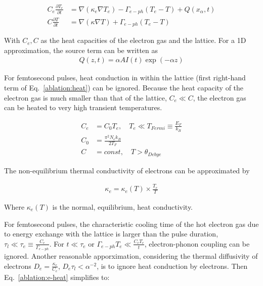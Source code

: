         \begin{align}
            C_e \frac{\partial T_e}{\partial t} &= \nabla (\kappa_e \nabla T_e) - \Gamma_{e-ph}(T_e - T) + Q(x_\alpha, t) \label{ablation:e-heat} \\
            C \frac{\partial T}{\partial t} &= \nabla (\kappa \nabla T) + \Gamma_{e-ph}(T_e - T) \label{ablation:heat}
        \end{align}

        With $C_e, C$ as the heat capacities of the electron gas and the lattice. For a 1D approximation, the source term can
        be written as
        \begin{align}
            Q(z,t) = \alpha A I(t) \exp(-\alpha z)
        \end{align}

        For femtosecond pulses, heat conduction in within the lattice (first right-hand term of Eq.~\ref{ablation:heat}) can be ignored.
        Because the heat capacity of the electron gas is much smaller than that of the lattice, $C_e \ll C$,  the electron gas can
        be heated to very high transient temperatures.

        \begin{align}
            C_e &= C_0 T_e, \quad T_e \ll T_{Fermi} \equiv \frac{E_F}{k_B} \\
            C_0 &= \frac{\pi^2 N_e k_B}{2T_F} \\
            C &= const, \quad T > \theta_{Debye}
        \end{align}

        The non-equilibrium thermal conductivity of electrons can be approximated by

        \begin{align}
            \kappa_e = \kappa_e(T) \times \frac{T_e}{T}
        \end{align}

        Where $\kappa_e(T)$ is the normal, equilibrium, heat conductivity.

            For femtosecond pulses, the characteristic cooling time of the hot electron gas due to energy exchange with the lattice
        is larger than the pulse duration, $\tau_l \ll \tau_e \equiv \frac{C_e}{\Gamma_{e-ph}}$. For
        $t \ll \tau_e$ or $\Gamma_{e-ph}T_e \ll \frac{C_e T_e}{t}$, electron-phonon coupling can be ignored. Another reasonable apporximation,
        considering the thermal diffusivity of electrons $D_e = \frac{\kappa_e}{C_e}$, $D_e\tau_l < \alpha^{-2}$, is to ignore heat
        conduction by electrons. Then Eq.~\ref{ablation:e-heat} simplifies to:

